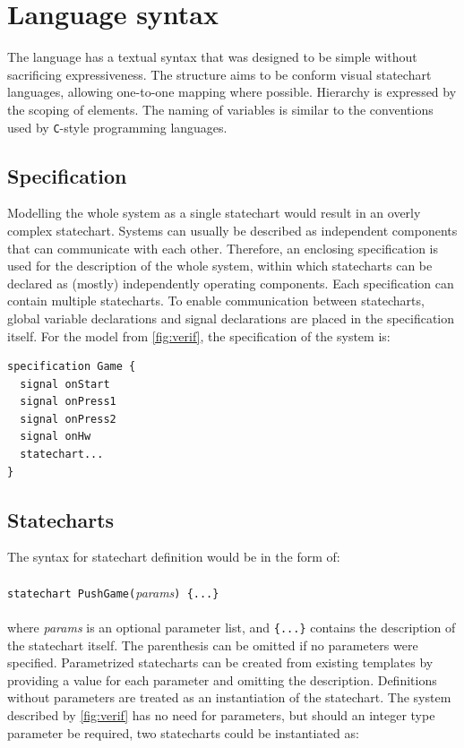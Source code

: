 \section{Language syntax}
The language has a textual syntax that was designed to be simple without sacrificing expressiveness. The structure aims to be conform visual statechart languages, allowing one-to-one mapping where possible. Hierarchy is expressed by the scoping of elements. The naming of variables is similar to the conventions used by \verb!C!-style programming languages.
  \subsection{Specification}
Modelling the whole system as a single statechart would result in an overly complex statechart. Systems can usually be described as independent components that can communicate with each other. Therefore, an enclosing specification is used for the description of the whole system, within which statecharts can be declared as (mostly) independently operating components. Each specification can contain multiple statecharts. To enable communication between statecharts, global variable declarations and signal declarations are placed in the specification itself. For the model from \cref{fig:verif}, the specification of the system is:

\begin{lstlisting}
specification Game {
  signal onStart
  signal onPress1
  signal onPress2
  signal onHw
  statechart...
}
\end{lstlisting}

  \subsection{Statecharts}
The syntax for statechart definition would be in the form of:
\\\\\verb!statechart PushGame(!\textit{params}\verb!) {...}!\\\\
where \textit{params} is an optional parameter list, and \verb!{...}! contains the description of the statechart itself. The parenthesis can be omitted if no parameters were specified. Parametrized statecharts can be created from existing templates by providing a value for each parameter and omitting the description. Definitions without parameters are treated as an instantiation of the statechart. The system described by \cref{fig:verif} has no need for parameters, but should an integer type parameter be required, two statecharts could be instantiated as:

